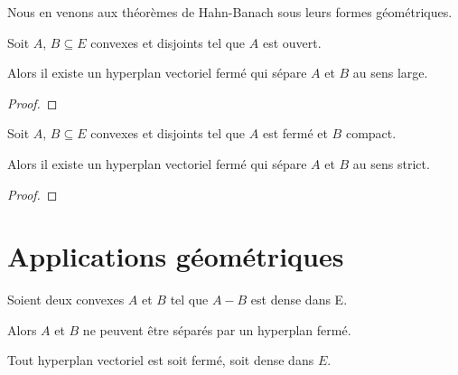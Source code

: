 Nous en venons aux théorèmes de Hahn-Banach sous leurs formes géométriques.

\begin{theorem} 
	Soit $A$, $B \subseteq E$ convexes et disjoints tel que $A$ est ouvert.

	Alors il existe un hyperplan vectoriel fermé qui sépare $A$ et $B$ au sens
	large.
\end{theorem}

\begin{proof}
	
\end{proof}

\begin{theorem} 
	Soit $A$, $B \subseteq E$ convexes et disjoints tel que $A$ est fermé et $B$
	compact.

	Alors il existe un hyperplan vectoriel fermé qui sépare $A$ et $B$ au sens
	strict.
\end{theorem}

\begin{proof}
	
\end{proof}

\section{Applications géométriques}

\begin{corollary}
	Soient deux convexes $A$ et $B$ tel que $A-B$ est dense dans E.

	Alors $A$ et $B$ ne peuvent être séparés par un hyperplan fermé.
\end{corollary}

\begin{corollary}
	Tout hyperplan vectoriel est soit fermé, soit dense dans $E$.
\end{corollary}
